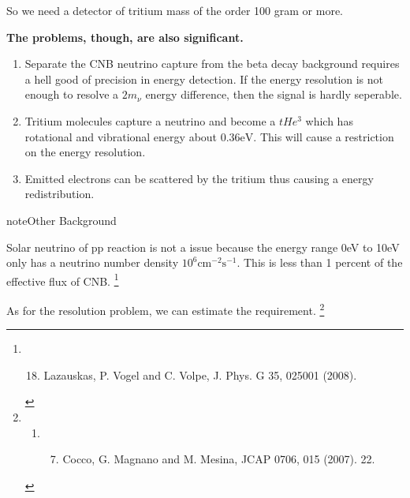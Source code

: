 \documentclass[letterpaper,12pt,english]{sphinxmanual}
\begin{document}
So we need a detector of tritium mass of the order 100 gram or more.

\textbf{The problems, though, are also significant.}
\begin{enumerate}
\item {} 
Separate the CNB neutrino capture from the beta decay background requires a hell good of precision in energy detection. If the energy resolution is not enough to resolve a \(2m_\nu\) energy difference, then the signal is hardly seperable.

\item {} 
Tritium molecules capture a neutrino and become a \(t He^3\) which has rotational and vibrational energy about \(0.36\mathrm{eV}\). This will cause a restriction on the energy resolution.

\item {} 
Emitted electrons can be scattered by the tritium thus causing a energy redistribution.

\end{enumerate}

\begin{notice}{note}{Other Background}

Solar neutrino of pp reaction is not a issue because the energy range 0eV to 10eV only has a neutrino number density \(10^6\mathrm{cm}^{-2} \mathrm{s}^{-1}\). This is less than 1 percent of the effective flux of CNB. \footnote[9]{\begin{enumerate}
\setcounter{enumi}{17}
\item {} 
Lazauskas, P. Vogel and C. Volpe, J. Phys. G 35, 025001 (2008).

\end{enumerate}
}
\end{notice}

As for the resolution problem, we can estimate the requirement. \footnote[8]{\begin{enumerate}
\item {} \begin{enumerate}
\setcounter{enumi}{6}
\item {} 
Cocco, G. Magnano and M. Mesina, JCAP 0706, 015 (2007). 22.

\end{enumerate}

\end{enumerate}
}
\end{document}
